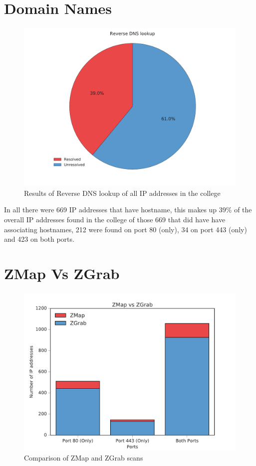 \documentclass[a4wide,leqno,12pt]{report}
\begin{document}
\section{Domain Names}
\begin{figure}[H]
\centering
\includegraphics[scale=.45]{pdf_images/ReverseDNSlookup}
\caption{Results of Reverse DNS lookup of all IP addresses in the college}
\end{figure}

In all there were 669 IP addresses that have hostname, this makes up 39\% of the overall IP addresses found in the college of those 669 that did have have associating hostnames, 212 were found on port 80 (only), 34 on port 443 (only) and 423 on both ports.


\section{ZMap Vs ZGrab}
\begin{figure}[H]
\centering
\includegraphics[scale=.5]{pdf_images/ZMapvsZGrab}
\caption{Comparison of ZMap and ZGrab scans}
\label{fig:zmap_vs_zgrab}
\end{figure}
\end{document}
